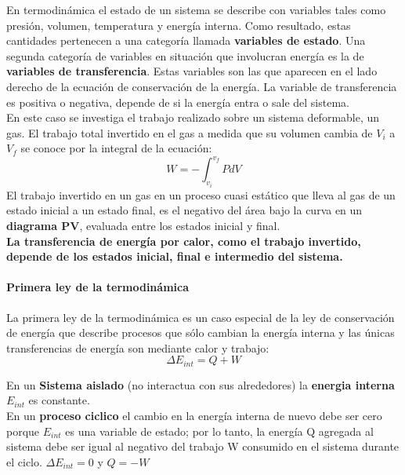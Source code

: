 \documentclass[10pt]{article}
\begin{document}
En termodinámica el estado de un sistema se describe con variables tales como presión, volumen, temperatura y energía interna. Como resultado, estas cantidades pertenecen a una categoría llamada \textbf{variables de estado}. Una segunda categoría de variables en situación que involucran energía es la de \textbf{variables de transferencia}. Estas variables son las que aparecen en el lado derecho de la ecuación de conservación de la energía. La variable de transferencia es positiva o negativa, depende de si la energía entra o sale del sistema.\\
\linebreak
En este caso se investiga el trabajo realizado sobre un sistema deformable, un gas.
 El trabajo total invertido en el gas a medida que su volumen cambia de $V_i$  a $V_f$  se conoce por la integral de la ecuación:
\begin{equation*}
	W = - \int_{v_i}^{v_f}P dV
\end{equation*}
El trabajo invertido en un gas en un proceso cuasi estático que lleva al gas de un estado inicial a un estado final, es el negativo del área bajo la curva en un \textbf{diagrama PV}, evaluada entre los estados inicial y final.\\
\linebreak
\textbf{La transferencia de energía por calor, como el trabajo invertido, depende
de los estados inicial, final e intermedio del sistema. }

\paragraph{Primera ley de la termodinámica}

La primera ley de la termodinámica es un caso especial de la ley de conservación de energía que describe procesos que sólo cambian la energía interna y las únicas transferencias de energía son mediante calor y trabajo:
\begin{equation*}
	\Delta E_{int} = Q + W
\end{equation*}

En un \textbf{Sistema aislado} (no interactua con sus alrededores) la \textbf{energia interna $E_{int}$} es constante.\\
\linebreak
En un \textbf{proceso ciclico}  el cambio en la energía interna de nuevo debe ser cero porque $E_{int}$ es una variable de estado; por lo tanto, la energía Q agregada al sistema debe ser igual al negativo del trabajo W consumido en el sistema durante el ciclo. $\Delta E_{int} = 0$ y $Q = -W$
\end{document}
